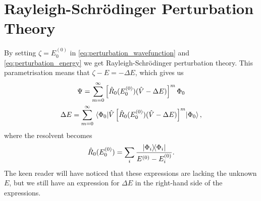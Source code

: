 \section{Rayleigh-Schrödinger Perturbation Theory}

By setting $\zeta = E_0^{(0)}$ in \autoref{eq:perturbation_wavefunction} and
\autoref{eq:perturbation_energy} we get Rayleigh-Schrödinger perturbation
theory\cite{rayleigh1894theory,schrodinger1926quantisierung}. This parametrisation 
means that $\zeta - E = - \Delta E$, which gives us 
\begin{gather}
    \label{eq:rspt_wavefunction}
    \Psi = \sum_{m=0}^\infty \left[ 
        \hat{R}_0(E^{(0)}_0) (\hat{V} - \Delta E)     
    \right]^m \Phi_0 \\
    \label{eq:rspt_energy}
    \Delta E =  \sum_{m=0}^\infty \mel*{\Phi_0}
    {
        \hat{V} \left[\hat{R}_0 (E^{(0)}_0)(\hat{V} - \Delta E) \right]^m
    }{\Phi_0},
\end{gather}
where the resolvent becomes
\begin{equation}
    \hat{R}_0(E^{(0)}_0) = \sum_i \frac{\dyad{\Phi_i}{\Phi_i}}{E^{(0)} - E^{(0)}_i}.
\end{equation}
The keen reader will have noticed that these expressions are lacking the unknown 
$E$, but we still have an expression for $\Delta E$ in the right-hand side of the
expressions.


